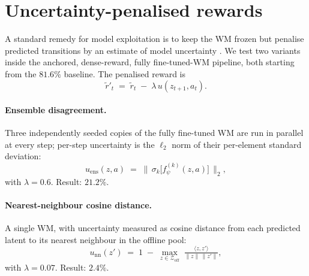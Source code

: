 \section{Uncertainty-penalised rewards}
\label{sec:owm-exp45}

A standard remedy for model exploitation is to keep the WM frozen but
penalise predicted transitions by an estimate of model uncertainty
\cite{yu2020mopomodelbasedofflinepolicy, yu2021combo}. We test two
variants inside the anchored, dense-reward, fully fine-tuned-WM
pipeline, both starting from the $81.6\%$ baseline. The penalised
reward is
\begin{equation}
    \tilde r'_t \;=\; \tilde r_t \;-\; \lambda\, u(z_{t+1}, a_t).
    \label{eq:owm-mopo-reward}
\end{equation}

\paragraph{Ensemble disagreement.}
Three independently seeded copies of the fully fine-tuned WM are run in
parallel at every step; per-step uncertainty is the $\ell_2$ norm of
their per-element standard deviation:
\begin{equation}
    u_{\text{ens}}(z, a) \;=\; \Big\|\,\sigma_k\!\big[f_\psi^{(k)}(z, a)\big]\,\Big\|_2,
    \label{eq:owm-mopo-ens}
\end{equation}
with $\lambda = 0.6$. Result: $21.2\%$.

\paragraph{Nearest-neighbour cosine distance.}
A single WM, with uncertainty measured as cosine distance from each
predicted latent to its nearest neighbour in the offline pool:
\begin{equation}
    u_{\text{nn}}(z') \;=\; 1 \;-\; \max_{z\in\mathcal{Z}_{\text{off}}}\;
        \tfrac{\langle z, z'\rangle}{\|z\|\,\|z'\|},
    \label{eq:owm-mopo-nn}
\end{equation}
with $\lambda = 0.07$. Result: $2.4\%$.

